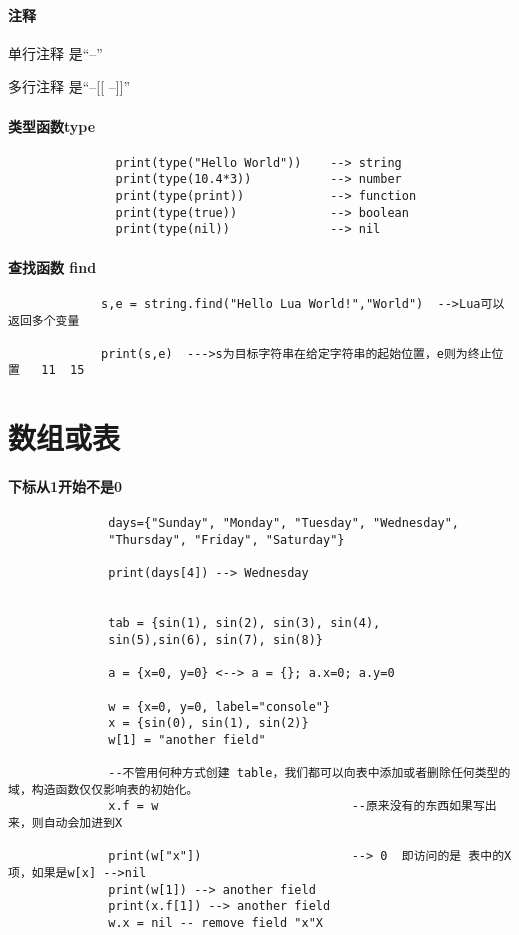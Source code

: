 \documentclass[UTF8,a4paper,8pt]{ctexart}
\begin{document}
	 \paragraph{注释}
		 单行注释 是“--”
		 
		 多行注释 是“--[[      --]]”
		 
	 \paragraph{类型函数type}
		   \begin{lstlisting}
			   print(type("Hello World"))    --> string
			   print(type(10.4*3))           --> number
			   print(type(print))            --> function
			   print(type(true))             --> boolean
			   print(type(nil))              --> nil
		   \end{lstlisting}
	\paragraph{查找函数 find}
		 \begin{lstlisting}
			 s,e = string.find("Hello Lua World!","World")  -->Lua可以返回多个变量
			 			 
			 print(s,e)  --->s为目标字符串在给定字符串的起始位置，e则为终止位置   11  15
		 \end{lstlisting}
\newpage
\section{数组或表}
	\paragraph{下标从1开始不是0}
			\begin{lstlisting}
		      days={"Sunday", "Monday", "Tuesday", "Wednesday",
		      "Thursday", "Friday", "Saturday"}
		      
		      print(days[4]) --> Wednesday
		      
		      
		      tab = {sin(1), sin(2), sin(3), sin(4),
		      sin(5),sin(6), sin(7), sin(8)}
		      
		      a = {x=0, y=0} <--> a = {}; a.x=0; a.y=0
		      
		      w = {x=0, y=0, label="console"}
		      x = {sin(0), sin(1), sin(2)}
		      w[1] = "another field"
		      
		      --不管用何种方式创建 table，我们都可以向表中添加或者删除任何类型的域，构造函数仅仅影响表的初始化。
		      x.f = w							--原来没有的东西如果写出来，则自动会加进到X
		      
		      print(w["x"]) 				    --> 0  即访问的是 表中的X项，如果是w[x] -->nil
		      print(w[1]) --> another field
		      print(x.f[1]) --> another field
		      w.x = nil -- remove field "x"X
			\end{lstlisting}
\end{document}

